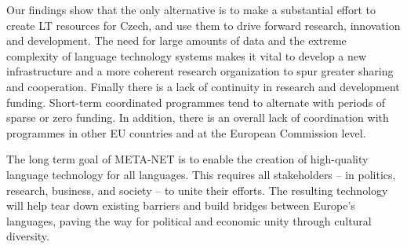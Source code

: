 \begin{multicols}{2}
Our findings show that the only alternative is to make a substantial effort to create LT resources for Czech, and use them to drive forward research, innovation and development. The need for large amounts of data and the extreme complexity of language technology systems makes it vital to develop a new infrastructure and a more coherent research organization to spur greater sharing and cooperation.
Finally there is a lack of continuity in research and development funding. Short-term coordinated programmes tend to alternate with periods of sparse or zero funding. In addition, there is an overall lack of coordination with programmes in other EU countries and at the European Commission level.

The long term goal of META-NET is to enable the creation of high-quality language technology for all languages. This requires all stakeholders -- in politics, research, business, and society -- to unite their efforts. The resulting technology will help tear down existing barriers and build bridges between Europe’s languages, paving the way for political and economic unity through cultural diversity.
\end{multicols}


